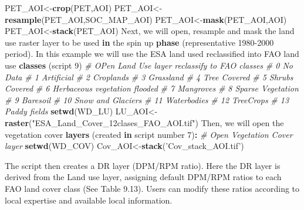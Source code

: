 \documentclass[
  10pt,
  b5paper,
]{book}
\newenvironment{Shaded}{\begin{snugshade}}{\end{snugshade}}
\newcommand{\CommentTok}[1]{\textcolor[rgb]{0.56,0.35,0.01}{\textit{#1}}}
\newcommand{\ControlFlowTok}[1]{\textcolor[rgb]{0.13,0.29,0.53}{\textbf{#1}}}
\newcommand{\DecValTok}[1]{\textcolor[rgb]{0.00,0.00,0.81}{#1}}
\newcommand{\KeywordTok}[1]{\textcolor[rgb]{0.13,0.29,0.53}{\textbf{#1}}}
\newcommand{\NormalTok}[1]{#1}
\newcommand{\OperatorTok}[1]{\textcolor[rgb]{0.81,0.36,0.00}{\textbf{#1}}}
\newcommand{\StringTok}[1]{\textcolor[rgb]{0.31,0.60,0.02}{#1}}
\begin{document}
\begin{Shaded}
\begin{Highlighting}[]
\NormalTok{PET_AOI<-}\KeywordTok{crop}\NormalTok{(PET,AOI)}
\NormalTok{PET_AOI<-}\KeywordTok{resample}\NormalTok{(PET_AOI,SOC_MAP_AOI)}
\NormalTok{PET_AOI<-}\KeywordTok{mask}\NormalTok{(PET_AOI,AOI)}
\NormalTok{PET_AOI<-}\KeywordTok{stack}\NormalTok{(PET_AOI)}
\NormalTok{Next, we will open, resample and mask the land use raster layer to be used }\ControlFlowTok{in}\NormalTok{ the spin up }\KeywordTok{phase}\NormalTok{ (representative }\DecValTok{1980-2000}\NormalTok{ period).  In this example we will use the ESA land used reclassified into FAO land use }\KeywordTok{classes}\NormalTok{ (script }\DecValTok{9}\NormalTok{)}
\CommentTok{# OPen Land Use layer reclassify to FAO classes }
\CommentTok{# 0 No Data}
\CommentTok{# 1 Artificial}
\CommentTok{# 2 Croplands}
\CommentTok{# 3 Grassland}
\CommentTok{# 4 Tree Covered}
\CommentTok{# 5 Shrubs Covered}
\CommentTok{# 6 Herbaceous vegetation flooded}
\CommentTok{# 7 Mangroves}
\CommentTok{# 8 Sparse Vegetation}
\CommentTok{# 9 Baresoil}
\CommentTok{# 10 Snow and Glaciers}
\CommentTok{# 11 Waterbodies}
\CommentTok{# 12 TreeCrops}
\CommentTok{# 13 Paddy fields}
\KeywordTok{setwd}\NormalTok{(WD_LU)}
\NormalTok{LU_AOI<-}\KeywordTok{raster}\NormalTok{(}\StringTok{"ESA_Land_Cover_12clases_FAO_AOI.tif"}\NormalTok{)}
\NormalTok{Then, we will open the vegetation cover }\KeywordTok{layers}\NormalTok{ (created }\ControlFlowTok{in}\NormalTok{ script number }\DecValTok{7}\NormalTok{)}\OperatorTok{:}
\CommentTok{# Open Vegetation Cover layer }
\KeywordTok{setwd}\NormalTok{(WD_COV)}
\NormalTok{Cov_AOI<-}\KeywordTok{stack}\NormalTok{(}\StringTok{'Cov_stack_AOI.tif'}\NormalTok{)}
\end{Highlighting}
\end{Shaded}

The script then creates a DR layer (DPM/RPM ratio). Here the DR layer is derived from the Land use layer, assigning default DPM/RPM ratios to each FAO land cover class (See Table 9.13). Users can modify these ratios according to local expertise and available local information.
\end{document}
